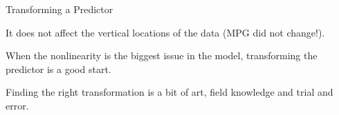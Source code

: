 \documentclass{beamer}\usepackage[]{graphicx}\usepackage[]{color}
\begin{document}
\begin{darkframes}
\begin{frame}[fragile]{Transforming a Predictor}
\begin{center}
        It does not affect the vertical locations of the data (MPG did not change!). \bigskip \pause
        
        When the nonlinearity is the biggest issue in the model, transforming the predictor is a good start. \bigskip \pause
        
        Finding the right transformation is a bit of art, field knowledge and trial and error.
        
      \end{center}
    
    \end{frame}


  \end{darkframes}

  
\end{document}
